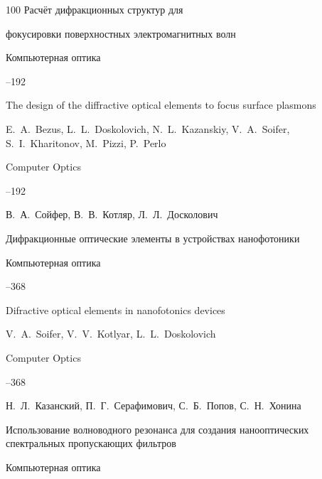 \begin{thebibliography}{100}
\paper Расчёт дифракционных структур для

фокусировки поверхностных электромагнитных волн

\jour Компьютерная оптика




--192

\misctransl

\paper The design of the diffractive optical elements to focus surface plasmons

\by E.~A.~Bezus, L.~L.~Doskolovich, N.~L.~Kazanskiy, V.~A.~Soifer, S.~I.~Kharitonov, M.~Pizzi, P.~Perlo

\jour Computer Optics




--192




\by В.~А.~Сойфер, В.~В.~Котляр, Л.~Л.~Досколович

\paper Дифракционные оптические элементы в устройствах нанофотоники

\jour Компьютерная оптика




--368

\misctransl

\paper Difractive optical elements in nanofotonics devices

\by V.~A.~Soifer, V.~V.~Kotlyar, L.~L.~Doskolovich 

\jour Computer Optics




--368






\by Н.~Л.~Казанский, П.~Г.~Серафимович, С.~Б.~Попов, С.~Н.~Хонина

\paper Использование волноводного резонанса для создания нанооптических спектральных пропускающих фильтров

\jour Компьютерная оптика



\end{thebibliography}
